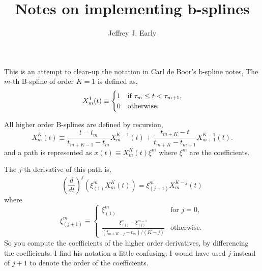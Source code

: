\documentclass[11pt, oneside]{article}   	%
\title{Notes on implementing b-splines}
\author{Jeffrey J. Early}
\begin{document}
\maketitle

This is an attempt to clean-up the notation in Carl de Boor's b-spline notes,
The $m$-th B-spline of order $K=1$ is defined as,
\begin{equation}
X^1_m(t) \equiv \begin{cases}
1      & \text{if $ \tau_m \leq t < \tau_{m+1}$}, \\
0     & \text{otherwise}.
\end{cases}
\end{equation}

All higher order B-splines are defined by recursion,
\begin{equation}
X^K_m(t) \equiv \frac{t - t_m}{t_{m+K-1} - t_m} X^{K-1}_m(t) + \frac{t_{m+K}-t}{t_{m+K} - t_{m+1}} X^{K-1}_{m+1}(t).
\end{equation}
and a path is represented as $x(t) \equiv  X^K_m(t) \xi^m$ where $\xi^m$ are the coefficients.

The $j$-th derivative of this path is,
\begin{equation}
\left(\frac{d}{dt}\right)^j \left( \xi_{(1)}^m X^K_m(t)\right) = \xi_{(j+1)}^m X^{K-j}_m(t)
\end{equation}
where 
\begin{equation}
\xi_{(j+1)}^m \equiv \begin{cases}
\xi_{(1)}^m      & \text{for $j=0$}, \\
\frac{\xi_{(j)}^m - \xi_{(j)}^{m-1}}{ (t_{m+K-j} - t_m)/(K-j) }    & \text{otherwise}.
\end{cases}
\end{equation}
So you compute the coefficients of the higher order derivatives, by differencing the coefficients. I find his notation a little confusing. I would have used $j$ instead of $j+1$ to denote the order of the coefficients.
\end{document}

